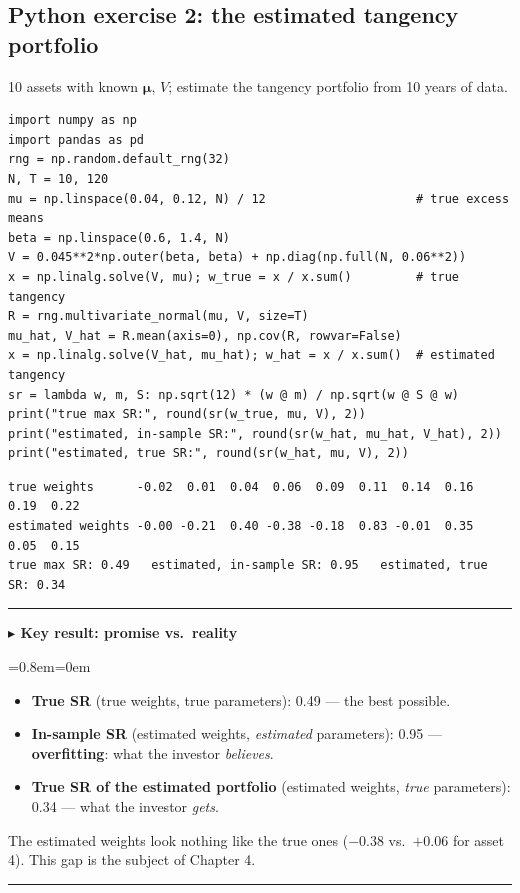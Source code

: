 \documentclass[11pt,a4paper]{report}
\newenvironment{notebox}[1]
  {\par\medskip\Needspace{6\baselineskip}\noindent\rule{\linewidth}{0.4pt}\par\nopagebreak
   \noindent\textbf{#1}\par\nopagebreak
   \begin{list}{}{\leftmargin=0.8em\rightmargin=0em\topsep=2pt}\item[]}
  {\end{list}\nopagebreak\noindent\rule{\linewidth}{0.4pt}\par\medskip}
\newenvironment{keybox}[1][]{\begin{notebox}{$\blacktriangleright$ Key result#1}}{\end{notebox}}
\newcommand{\mub}{\bm{\mu}}
\begin{document}
\subsection*{Python exercise 2: the estimated tangency portfolio}
10 assets with known $\mub$, $V$; estimate the tangency portfolio from 10 years of data.
\begin{lstlisting}
import numpy as np
import pandas as pd
rng = np.random.default_rng(32)
N, T = 10, 120
mu = np.linspace(0.04, 0.12, N) / 12                     # true excess means
beta = np.linspace(0.6, 1.4, N)
V = 0.045**2*np.outer(beta, beta) + np.diag(np.full(N, 0.06**2))
x = np.linalg.solve(V, mu); w_true = x / x.sum()         # true tangency
R = rng.multivariate_normal(mu, V, size=T)
mu_hat, V_hat = R.mean(axis=0), np.cov(R, rowvar=False)
x = np.linalg.solve(V_hat, mu_hat); w_hat = x / x.sum()  # estimated tangency
sr = lambda w, m, S: np.sqrt(12) * (w @ m) / np.sqrt(w @ S @ w)
print("true max SR:", round(sr(w_true, mu, V), 2))
print("estimated, in-sample SR:", round(sr(w_hat, mu_hat, V_hat), 2))
print("estimated, true SR:", round(sr(w_hat, mu, V), 2))
\end{lstlisting}
\begin{lstlisting}[style=out]
true weights      -0.02  0.01  0.04  0.06  0.09  0.11  0.14  0.16  0.19  0.22
estimated weights -0.00 -0.21  0.40 -0.38 -0.18  0.83 -0.01  0.35  0.05  0.15
true max SR: 0.49   estimated, in-sample SR: 0.95   estimated, true SR: 0.34
\end{lstlisting}
\begin{keybox}[: promise vs.\ reality]
\begin{itemize}
  \item \textbf{True SR} (true weights, true parameters): 0.49 --- the best possible.
  \item \textbf{In-sample SR} (estimated weights, \emph{estimated} parameters): 0.95 --- \textbf{overfitting}: what the investor \emph{believes}.
  \item \textbf{True SR of the estimated portfolio} (estimated weights, \emph{true} parameters): 0.34 --- what the investor \emph{gets}.
\end{itemize}
The estimated weights look nothing like the true ones ($-0.38$ vs.\ $+0.06$ for
asset 4). This gap is the subject of Chapter 4.
\end{keybox}
\end{document}
